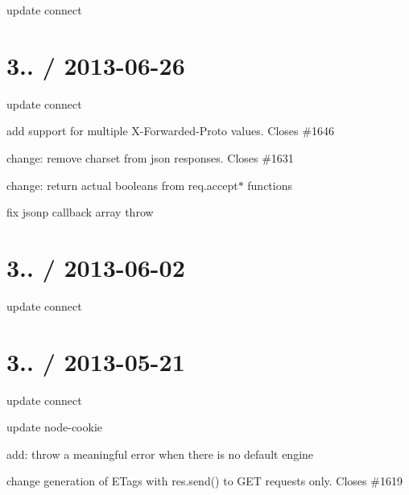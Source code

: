 {\ttfamily }

{\ttfamily 
\begin{DoxyItemize}
\item update connect
\end{DoxyItemize}}

{\ttfamily \section*{3.. / 2013-\/06-\/26 }}

{\ttfamily }

{\ttfamily 
\begin{DoxyItemize}
\item update connect
\item add support for multiple X-\/\+Forwarded-\/\+Proto values. Closes \#1646
\item change\+: remove charset from json responses. Closes \#1631
\item change\+: return actual booleans from req.\+accept$\ast$ functions
\item fix jsonp callback array throw
\end{DoxyItemize}}

{\ttfamily \section*{3.. / 2013-\/06-\/02 }}

{\ttfamily }

{\ttfamily 
\begin{DoxyItemize}
\item update connect
\end{DoxyItemize}}

{\ttfamily \section*{3.. / 2013-\/05-\/21 }}

{\ttfamily }

{\ttfamily 
\begin{DoxyItemize}
\item update connect
\item update node-\/cookie
\item add\+: throw a meaningful error when there is no default engine
\item change generation of E\+Tags with res.\+send() to G\+ET requests only. Closes \#1619
\end{DoxyItemize}}

